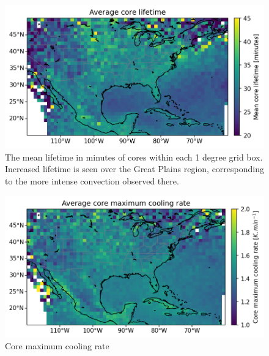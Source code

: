 \begin{figure}[tp]
    \centering
    \includegraphics[width=\textwidth]{figures/ch2_07.png}
    \caption{The mean lifetime in minutes of cores within each 1 degree grid box. Increased lifetime is seen over the Great Plains region, corresponding to the more intense convection observed there.}
    \label{fig:core_lifetime_map}
\end{figure}

\begin{figure}[tp]
    \centering
    \includegraphics[width=\textwidth]{figures/ch2_08.png}
    \caption{Core maximum cooling rate}
    \label{fig:core_cooling_rate_map}
\end{figure}

